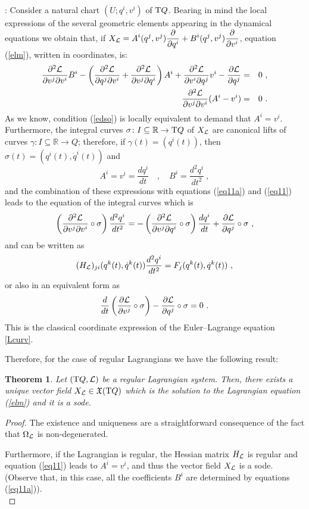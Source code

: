 \documentclass[12pt]{report}
\newtheorem{teor}{Theorem}[chapter]
\def\beq{\begin{equation}}
\def\eeq{\end{equation}}
\def\bea{\begin{eqnarray}}
\def\eea{\end{eqnarray}}
\def\dst{\displaystyle}
\def\derpar#1#2{\frac{\partial{#1}}{\partial{#2}}}
\def\qed{\ifvmode\removelastskip\fi
{\unskip\nobreak\hfil\penalty50\hbox{}\nobreak\hfil
\hbox{\vrule height1.2ex width1.2ex}\parfillskip=0pt
\finalhyphendemerits=0 \par\smallskip}}
\def\vf{\mathfrak X}
\def\Lag{{\cal L}}
\def\Real{\mathbb{R}}
\def\Tan{{\rm T}}
\begin{document}
:
Consider a natural chart $(U;q^i,v^i)$ of $\Tan Q$.
Bearing in mind  the local expressions of the several geometric elements
appearing in the dynamical equations we obtain that, if
\(\dst X_\Lag = A^i(q^j,v^j) \derpar{}{q^i} +
B^i(q^j,v^j) \derpar{}{v^i}\),
equation (\ref{elm}), written in coordinates, is:
\bea
\frac{\partial^2\Lag}{\partial v^j \partial v^i}B^i -
\left(\frac{\partial^2\Lag}{\partial q^j \partial v^i} +
\frac{\partial^2\Lag}{\partial v^j \partial q^i}\right)A^i +
\frac{\partial^2\Lag}{\partial v^i \partial q^j}v^i -
\derpar{\Lag}{q^j} &=& 0 \ ,
\label{eq11a}
\\
\frac{\partial^2\Lag}{\partial v^j \partial v^i}(A^i-v^i) &=& 0 \ .
\label{eq11}
\eea
As we know, condition (\ref{edso}) is locally equivalent to demand that
$A^i=v^i$. Furthermore, the integral curves
$\sigma\colon I\subseteq\Real\to\Tan Q$ of $X_\Lag$
are canonical lifts of curves
$\gamma\colon I\subseteq\Real\to Q$; therefore, if
$\gamma(t)=(q^i(t))$, then $\sigma(t)=(q^i(t),\dot q^i(t))$ and
$$
A^i = v^i = \frac{d q^i}{d t}
\quad , \quad
B^i = \frac{d^2q^i}{d t^2} \ ,
$$
and the combination of these expressions with equations (\ref{eq11a}) and (\ref{eq11}) leads to the
equation of  the integral curves which is
$$
\left(\frac{\partial^2\Lag}{\partial v^j \partial v^i}\circ\sigma\right)
\frac{d^2q^i}{d t^2} =
-\left(\frac{\partial^2\Lag}{\partial v^j \partial q^i}\circ\sigma\right)
\frac{d q^i}{d t} +
\derpar{\Lag}{q^j}\circ\sigma \ ,
$$
and can be written as
$$
 (H_\Lag)_{ji}(q^k(t),\dot q^k(t))\frac{d^2q^i}{d t^2} =F_j( q^k(t),\dot q^k(t)) \ ,
$$
or also in an equivalent form as
\beq
\frac{d}{d t}\left(\derpar{\Lag}{v^j}\circ\sigma\right)-
\derpar{\Lag}{q^j}\circ\sigma=0 \ .
\label{ELequats}
\eeq
This is the classical coordinate expression of the Euler--Lagrange equation \eqref{Lcurv}.

Therefore, for the case of regular Lagrangians we have the following result:

\begin{teor}
Let $(\Tan Q,\Lag)$ be a regular Lagrangian system.
Then, there exists a unique vector field $X_\Lag\in\vf (\Tan Q)$
which is the solution to the Lagrangian equation
(\ref{elm}) and it is a {\sc sode}.
\end{teor}
\begin{proof}
The existence and uniqueness are a straightforward consequence 
of the fact that $\Omega_\Lag$ is non-degenerated.

Furthermore, if the Lagrangian is regular, the Hessian matrix
$H_\Lag$ is regular and equation (\ref{eq11}) leads to
$A^i = v^i$, and thus the vector field $X_\Lag$ is a {\sc sode}.
(Observe that, in this case, all the coefficients $B^i$ are determined
by equations (\ref{eq11a})).
\\ \qed \end{proof}
\end{document}

